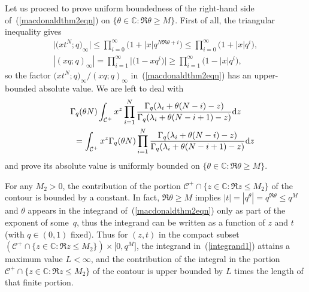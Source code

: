 \documentclass[pdftex]{sigma}
\numberwithin{equation}{section}
\newcommand{\C}{\mathbb{C}}
\newcommand{\CC}{\mathcal{C}}
\begin{document}
Let us proceed to prove uniform boundedness of the right-hand side of~(\ref{macdonaldthm2eqn}) on $\{\theta\in\C\colon \Re\theta \geq M\}$. First of all, the triangular inequality gives
\begin{gather*}
\big|\big(xt^N; q\big)_{\infty}\big| \leq \prod_{i=0}^{\infty}{\big(1 + |x| q^{N\Re\theta + i}\big)} \leq \prod_{i=0}^{\infty}{\big(1 + |x| q^i\big)}, \\ |(xq; q)_{\infty}| = \prod_{i=1}^{\infty}{\big|\big(1 - xq^i\big)\big|} \geq \prod_{i=1}^{\infty}{\big(1 - |x| q^i\big)},
\end{gather*}
so the factor $\big(xt^N; q\big)_{\infty}/(xq; q)_{\infty}$ in~(\ref{macdonaldthm2eqn}) has an upper-bounded absolute value. We are left to deal with
\begin{gather}
\Gamma_q(\theta N)\int_{\CC^+}{x^z \prod_{i=1}^N{\frac{\Gamma_q(\lambda_i + \theta(N - i) - z)}{\Gamma_q(\lambda_i + \theta(N - i + 1) - z)}} {\rm d}z}\nonumber\\
 \qquad {} = \int_{\CC^+}{x^z \Gamma_q(\theta N)\prod_{i=1}^N{\frac{\Gamma_q(\lambda_i + \theta(N - i) - z)}{\Gamma_q(\lambda_i + \theta(N - i + 1) - z)}}{\rm d}z}\label{integrand1}
\end{gather}
and prove its absolute value is uniformly bounded on $\{\theta\in\C \colon \Re\theta \geq M\}$.

For any $M_2 > 0$, the contribution of the portion $\CC^+ \cap \{z\in\C \colon \Re z \leq M_2\}$ of the contour is bounded by a constant. In fact, $\Re\theta \geq M$ implies $|t| = |q^{\theta}| = q^{\Re\theta} \leq q^M$ and $\theta$ appears in the integrand of~(\ref{macdonaldthm2eqn}) only as part of the exponent of some~$q$, thus the integrand can be written as a function of $z$ and $t$ (with $q\in (0, 1)$ f\/ixed). Thus for $(z, t)$ in the compact subset $(\CC^+ \cap \{z\in\C\colon \Re z \leq M_2\})\times \big[0, q^M\big]$, the integrand in~(\ref{integrand1}) attains a maximum value $L < \infty$, and the contribution of the integral in the portion $\CC^+ \cap \{z\in\C\colon \Re z \leq M_2\}$ of the contour is upper bounded by $L$ times the length of that f\/inite portion.
\end{document}
